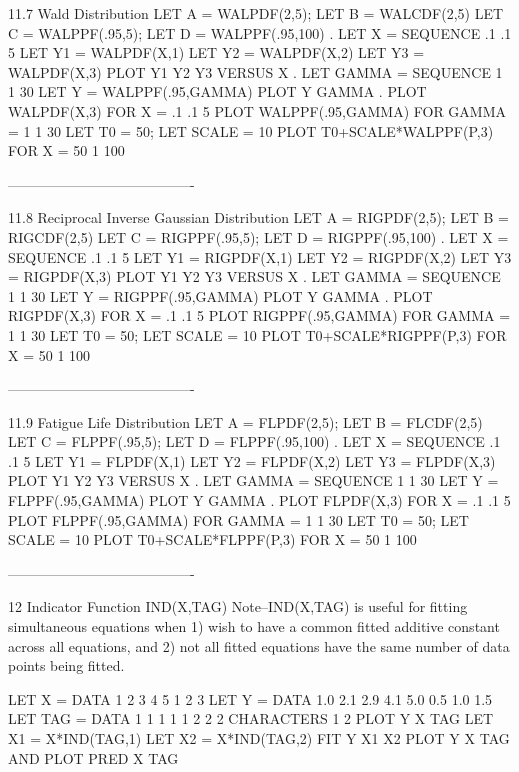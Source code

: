 11.7
Wald Distribution
      LET A = WALPDF(2,5); LET B = WALCDF(2,5)
      LET C = WALPPF(.95,5); LET D = WALPPF(.95,100)
      .
      LET X = SEQUENCE .1 .1 5
      LET Y1 = WALPDF(X,1)
      LET Y2 = WALPDF(X,2)
      LET Y3 = WALPDF(X,3)
      PLOT Y1 Y2 Y3 VERSUS X
      .
      LET GAMMA = SEQUENCE 1 1 30
      LET Y = WALPPF(.95,GAMMA)
      PLOT Y GAMMA
      .
      PLOT WALPDF(X,3) FOR X = .1 .1 5
      PLOT WALPPF(.95,GAMMA) FOR GAMMA = 1 1 30
      LET T0 = 50; LET SCALE = 10
      PLOT T0+SCALE*WALPPF(P,3) FOR X = 50 1 100
 
----------------------------------------
 
11.8
Reciprocal Inverse Gaussian Distribution
      LET A = RIGPDF(2,5); LET B = RIGCDF(2,5)
      LET C = RIGPPF(.95,5); LET D = RIGPPF(.95,100)
      .
      LET X = SEQUENCE .1 .1 5
      LET Y1 = RIGPDF(X,1)
      LET Y2 = RIGPDF(X,2)
      LET Y3 = RIGPDF(X,3)
      PLOT Y1 Y2 Y3 VERSUS X
      .
      LET GAMMA = SEQUENCE 1 1 30
      LET Y = RIGPPF(.95,GAMMA)
      PLOT Y GAMMA
      .
      PLOT RIGPDF(X,3) FOR X = .1 .1 5
      PLOT RIGPPF(.95,GAMMA) FOR GAMMA = 1 1 30
      LET T0 = 50; LET SCALE = 10
      PLOT T0+SCALE*RIGPPF(P,3) FOR X = 50 1 100
 
 
----------------------------------------
 
11.9
Fatigue Life Distribution
      LET A = FLPDF(2,5); LET B = FLCDF(2,5)
      LET C = FLPPF(.95,5); LET D = FLPPF(.95,100)
      .
      LET X = SEQUENCE .1 .1 5
      LET Y1 = FLPDF(X,1)
      LET Y2 = FLPDF(X,2)
      LET Y3 = FLPDF(X,3)
      PLOT Y1 Y2 Y3 VERSUS X
      .
      LET GAMMA = SEQUENCE 1 1 30
      LET Y = FLPPF(.95,GAMMA)
      PLOT Y GAMMA
      .
      PLOT FLPDF(X,3) FOR X = .1 .1 5
      PLOT FLPPF(.95,GAMMA) FOR GAMMA = 1 1 30
      LET T0 = 50; LET SCALE = 10
      PLOT T0+SCALE*FLPPF(P,3) FOR X = 50 1 100
 
----------------------------------------
 
12
Indicator Function IND(X,TAG)
Note--IND(X,TAG) is useful for fitting simultaneous equations
      when 1) wish to have a common fitted additive constant
      across all equations, and 2) not all fitted equations
      have the same number of data points being fitted.
 
      LET X   = DATA 1   2   3   4   5      1   2   3
      LET Y   = DATA 1.0 2.1 2.9 4.1 5.0    0.5 1.0 1.5
      LET TAG = DATA 1   1   1   1   1       2   2   2
      CHARACTERS 1 2
      PLOT Y X TAG
      LET X1 = X*IND(TAG,1)
      LET X2 = X*IND(TAG,2)
      FIT Y X1 X2
      PLOT Y X TAG AND
      PLOT PRED X TAG
 
